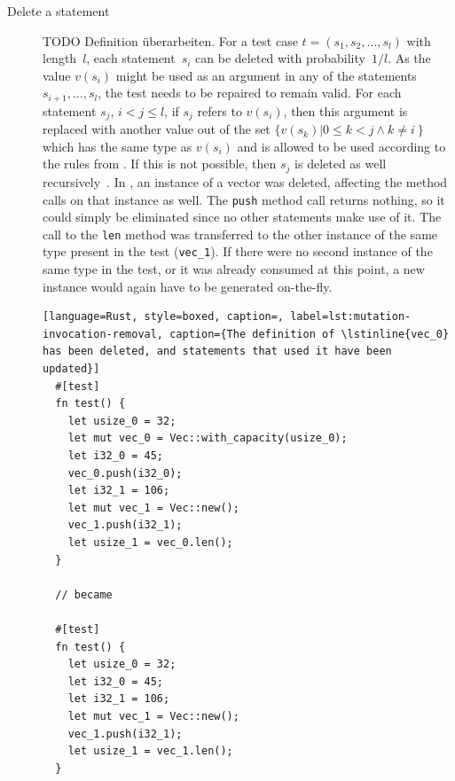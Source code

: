 \documentclass[paper=a4,%
  twoside,%
  BCOR4mm,%
  abstract=true,%
  toc=bibliography,%
  chapterprefix=true,%
  toc=bibliographynumbered,%
  open=right,%
  english,%
  pagesize=pdftex]{scrreprt}
\begin{document}
\begin{description}
  \item[Delete a statement] TODO Definition überarbeiten. For a test case $t = (s_1, s_2, \dots, s_l)$ with length~$l$, each statement~$s_i$ can be deleted with probability~$1/l$. As the value $v(s_i)$ might be used as an argument in any of the statements $s_{i+1}, \dots, s_l$, the test needs to be repaired to remain valid. For each statement $s_j$, $i < j \leq l$, if $s_j$ refers to $v(s_i)$, then this argument is replaced with another value out of the set $\{v(s_k) \left| 0 \leq k < j \wedge k \neq i \right\}$ which has the same type as $v(s_i)$ and is allowed to be used according to the rules from . If this is not possible, then $s_j$ is deleted as well recursively~\cite{Fraser2012}. In , an instance of a vector was deleted, affecting the method calls on that instance as well. The \lstinline{push} method call returns nothing, so it could simply be eliminated since no other statements make use of it. The call to the \lstinline{len} method was transferred to the other instance of the same type present in the test (\lstinline{vec_1}). If there were no second instance of the same type in the test, or it was already consumed at this point, a new instance would again have to be generated on-the-fly.

  \begin{lstlisting}[language=Rust, style=boxed, caption=, label=lst:mutation-invocation-removal, caption={The definition of \lstinline{vec_0} has been deleted, and statements that used it have been updated}]
  #[test]
  fn test() {
    let usize_0 = 32;
    let mut vec_0 = Vec::with_capacity(usize_0);
    let i32_0 = 45;
    vec_0.push(i32_0);
    let i32_1 = 106;
    let mut vec_1 = Vec::new();
    vec_1.push(i32_1);
    let usize_1 = vec_0.len();
  }

  // became

  #[test]
  fn test() {
    let usize_0 = 32;
    let i32_0 = 45;
    let i32_1 = 106;
    let mut vec_1 = Vec::new();
    vec_1.push(i32_1);
    let usize_1 = vec_1.len();
  }
  \end{lstlisting}

\end{description}
\end{document}
